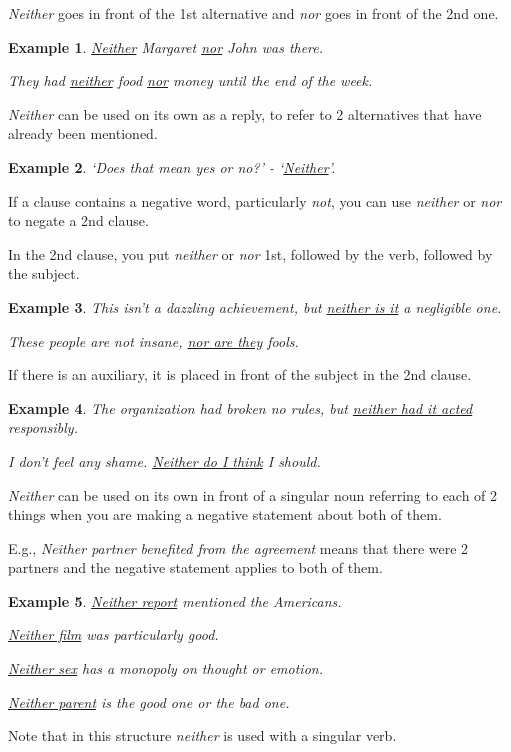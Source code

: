 \documentclass[oneside]{book}
\numberwithin{equation}{section}
\newtheorem{example}{Example}[section]
\begin{document}
\textit{Neither} goes in front of the 1st alternative and \textit{nor} goes in front of the 2nd one.
\begin{example}
    \underline{Neither} Margaret \underline{nor} John was there.
    
    They had \underline{neither} food \underline{nor} money until the end of the week.
\end{example}
%
\noindent{} \textit{Neither} can be used on its own as a reply, to refer to 2 alternatives that have already been mentioned.
\begin{example}
    `Does that mean yes or no?' - `\underline{Neither}'.
\end{example}
%
\noindent{} If a clause contains a negative word, particularly \textit{not}, you can use \textit{neither} or \textit{nor} to negate a 2nd clause.

In the 2nd clause, you put \textit{neither} or \textit{nor} 1st, followed by the verb, followed by the subject.
\begin{example}
    This isn't a dazzling achievement, but \underline{neither is it} a negligible one.
    
    These people are not insane, \underline{nor are they} fools.
\end{example}
If there is an auxiliary, it is placed in front of the subject in the 2nd clause.
\begin{example}
    The organization had broken no rules, but \underline{neither had it acted} responsibly.
    
    I don't feel any shame. \underline{Neither do I think} I should.
\end{example}
%
\noindent{} \textit{Neither} can be used on its own in front of a singular noun referring to each of 2 things when you are making a negative statement about both of them.

E.g., \textit{Neither partner benefited from the agreement} means that there were 2 partners and the negative statement applies to both of them.
\begin{example}
    \underline{Neither report} mentioned the Americans.
    
    \underline{Neither film} was particularly good.
    
    \underline{Neither sex} has a monopoly on thought or emotion.
    
    \underline{Neither parent} is the good one or the bad one.
\end{example}
Note that in this structure \textit{neither} is used with a singular verb.
\end{document}
